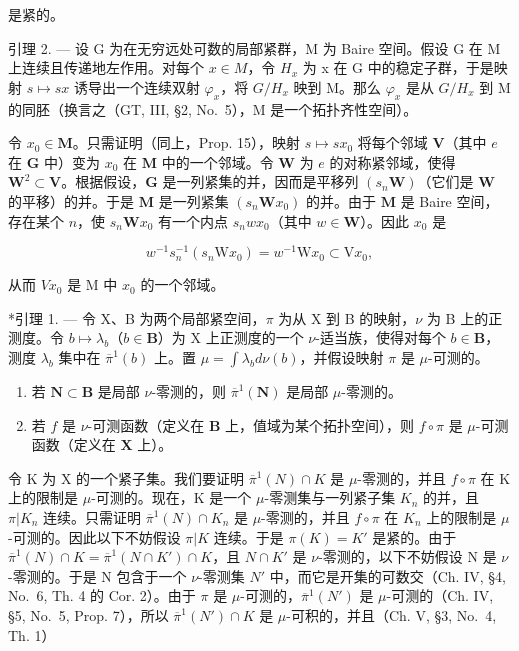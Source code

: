 是紧的。

引理 2. --- 设 G 为在无穷远处可数的局部紧群，M 为 Baire 空间。假设 G 在 M 上连续且传递地左作用。对每个 \(x \in M\)，令 \(H_{x}\) 为 x 在 G 中的稳定子群，于是映射 \(s \mapsto sx\) 诱导出一个连续双射 \(\varphi_{x}\)，将 \(G/H_{x}\) 映到 M。那么 \(\varphi_{x}\) 是从 \(G/H_{x}\) 到 M 的同胚（换言之（GT, III, §2, No.~5），M 是一个拓扑齐性空间）。

令 \(x_0 \in \mathbf{M}\)。只需证明（同上，Prop. 15），映射 \(s \mapsto sx_0\) 将每个邻域 \(\mathbf{V}\)（其中 \(e\) 在 \(\mathbf{G}\) 中）变为 \(x_0\) 在 \(\mathbf{M}\) 中的一个邻域。令 \(\mathbf{W}\) 为 \(e\) 的对称紧邻域，使得 \(\mathbf{W}^2 \subset \mathbf{V}\)。根据假设，\(\mathbf{G}\) 是一列紧集的并，因而是平移列 \((s_n\mathbf{W})\)（它们是 \(\mathbf{W}\) 的平移）的并。于是 \(\mathbf{M}\) 是一列紧集 \((s_n\mathbf{W}x_0)\) 的并。由于 \(\mathbf{M}\) 是 Baire 空间，存在某个 \(n\)，使 \(s_n\mathbf{W}x_0\) 有一个内点 \(s_nwx_0\)（其中 \(w \in \mathbf{W}\)）。因此 \(x_0\) 是

\[
w ^ {- 1} s _ {n} ^ {- 1} (s _ {n} \mathrm{W} x _ {0}) = w ^ {- 1} \mathrm{W} x _ {0} \subset \mathrm{V} x _ {0},
\]

从而 \(Vx_{0}\) 是 M 中 \(x_{0}\) 的一个邻域。

\appendixheading

*引理 1. --- 令 X、B 为两个局部紧空间，\(\pi\) 为从 X 到 B 的映射，\(\nu\) 为 B 上的正测度。令 \(b \mapsto \lambda_b\)（\(b \in \mathbf{B}\)）为 X 上正测度的一个 \(\nu\)-适当族，使得对每个 \(b \in \mathbf{B}\)，测度 \(\lambda_b\) 集中在 \(\overline{\pi}^1(b)\) 上。置 \(\mu = \int \lambda_b d\nu(b)\)，并假设映射 \(\pi\) 是 \(\mu\)-可测的。

\begin{enumerate}
\def\labelenumi{\alph{enumi})}
\item
  若 \(\mathbf{N} \subset \mathbf{B}\) 是局部 \(\nu\)-零测的，则 \(\overline{\pi}^1(\mathbf{N})\) 是局部 \(\mu\)-零测的。
\item
  若 \(f\) 是 \(\nu\)-可测函数（定义在 \(\mathbf{B}\) 上，值域为某个拓扑空间），则 \(f \circ \pi\) 是 \(\mu\)-可测函数（定义在 \(\mathbf{X}\) 上）。
\end{enumerate}

令 K 为 X 的一个紧子集。我们要证明 \(\overline{\pi}^{1}(N) \cap K\) 是 \(\mu\)-零测的，并且 \(f \circ \pi\) 在 K 上的限制是 \(\mu\)-可测的。现在，K 是一个 \(\mu\)-零测集与一列紧子集 \(K_{n}\) 的并，且 \(\pi|K_{n}\) 连续。只需证明 \(\overline{\pi}^{1}(N) \cap K_{n}\) 是 \(\mu\)-零测的，并且 \(f \circ \pi\) 在 \(K_{n}\) 上的限制是 \(\mu\)-可测的。因此以下不妨假设 \(\pi|K\) 连续。于是 \(\pi(K) = K'\) 是紧的。由于 \(\overline{\pi}^{1}(N) \cap K = \overline{\pi}^{1}(N \cap K') \cap K\)，且 \(N \cap K'\) 是 \(\nu\)-零测的，以下不妨假设 N 是 \(\nu\)-零测的。于是 N 包含于一个 \(\nu\)-零测集 \(N'\) 中，而它是开集的可数交（Ch. IV, §4, No.~6, Th. 4 的 Cor. 2）。由于 \(\pi\) 是 \(\mu\)-可测的，\(\overline{\pi}^{1}(N')\) 是 \(\mu\)-可测的（Ch. IV, §5, No.~5, Prop. 7），所以 \(\overline{\pi}^{1}(N') \cap K\) 是 \(\mu\)-可积的，并且（Ch. V, §3, No.~4, Th. 1）

